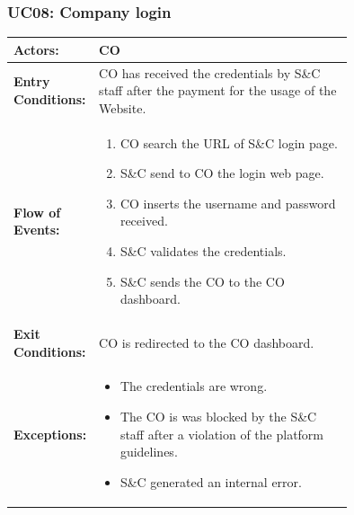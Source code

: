 \pagebreak


\subsubsection{UC08: Company login}
\label{subsubsec:company-login}

\begin{center}
    \begin{longtable}{|l|p{0.75\linewidth}|}
        \hline
        \textbf{Actors:}           & CO                                                                                            \\
        \hline
        \textbf{Entry Conditions:} & CO has received the credentials by S\&C staff after the payment for the usage of the Website. \\
        \hline
        \textbf{Flow of Events:}   & \begin{enumerate}
                                         \item CO search the URL of S\&C login page.
                                         \item S\&C send to CO the login web page.
                                         \item CO inserts the username and password received.
                                         \item S\&C validates the credentials.
                                         \item S\&C sends the CO to the CO dashboard.
                                     \end{enumerate}                                           \\
        \hline
        \textbf{Exit Conditions:}  & CO is redirected to the CO dashboard.                                                         \\
        \hline
        \textbf{Exceptions:}       &
        \begin{itemize}
            \item The credentials are wrong.
            \item The CO is was blocked by the S\&C staff after a violation of the platform guidelines.
            \item S\&C generated an internal error.
        \end{itemize}                                 \\
        \hline
    \end{longtable}
\end{center}

